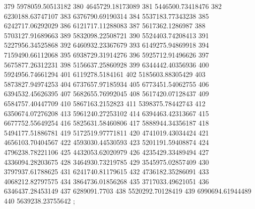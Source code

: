 {379 5978059.50513182
380 4645729.18173089
381 5446500.73418476
382 6230188.63747107
383 6376790.69190314
384 5537183.77343238
385 6242717.06292029
386 6121717.11288083
387 5617362.1286987
388 5703127.91689663
389 5832098.22508721
390 5524403.74208413
391 5227956.34525868
392 6460932.23367679
393 6149275.94869918
394 7159490.66112068
395 6938729.31914276
396 5925712.91496626
397 5675877.26312231
398 5156637.25860928
399 6344442.40356936
400 5924956.74661294
401 6119278.5184161
402 5185603.88305429
403 5873827.94974253
404 6737657.97185934
405 6773451.54062755
406 6394532.45626395
407 5682655.76992045
408 5617420.07128437
409 6584757.40447709
410 5867163.2152823
411 5398375.78442743
412 6350674.07276208
413 5961240.27253102
414 6394463.42313667
415 6677752.55649254
416 5825631.58460806
417 5888944.34356187
418 5494177.51886781
419 5172519.97771811
420 4741019.43034424
421 4656103.70404567
422 4593030.44530593
423 5201191.59408874
424 4796238.78221106
425 4432053.62020979
426 4235429.33489494
427 4336094.28203675
428 3464930.73219785
429 3545975.02857409
430 3797937.61788625
431 6241740.81179615
432 4736182.35286091
433 4068212.82797575
434 3864736.01856268
435 3717033.49621051
436 6346437.28453149
437 6289091.7703
438 5520292.70128419
439 6990694.61944489
440 5639238.23755642
};
%
